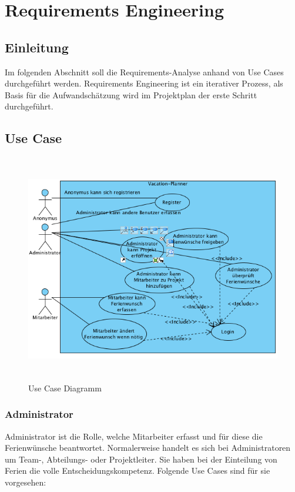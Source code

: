 \chapter{Requirements Engineering}

\section{Einleitung}
Im folgenden Abschnitt soll die Requirements-Analyse anhand von Use Cases durchgef\"uhrt werden. Requirements Engineering ist ein iterativer Prozess, als Basis f\"ur die Aufwandsch\"atzung wird im Projektplan der erste Schritt durchgef\"uhrt.


\section{Use Case}
\begin{figure}[h]
	\centering
	\includegraphics[height=10cm]{orgchart/reqeng_usecase}
	\caption[Use Case Diagramm]{Use Case Diagramm}
\end{figure}

\subsection{Administrator}
Administrator ist die Rolle, welche Mitarbeiter erfasst und f\"ur diese die Ferienw\"unsche beantwortet. Normalerweise handelt es sich bei Administratoren um Team-, Abteilungs- oder Projektleiter. Sie haben bei der Einteilung von Ferien die volle Entscheidungskompetenz. Folgende Use Cases sind f\"ur sie vorgesehen:

